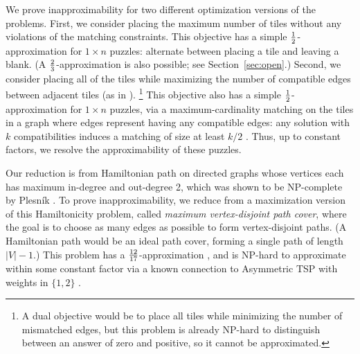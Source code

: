 \documentclass[11pt]{article}
\begin{document}
We prove inapproximability for two different optimization versions of the
problems.  First, we consider placing the maximum number of tiles without
any violations of the matching constraints.
This objective has a simple $1 \over 2$-approximation for $1 \times n$
puzzles: alternate between placing a tile and leaving a blank.
(A $2 \over 3$-approximation is also possible; see Section~\ref{sec:open}.)
Second, we consider placing all of the tiles while maximizing the number of
compatible edges between adjacent tiles (as in \cite{Antoniadis-Lingas-2010}).%
%
\footnote{A dual objective would be to place all tiles while minimizing the
  number of mismatched edges, but this problem is already NP-hard to
  distinguish between an answer of zero and positive, so it cannot be
  approximated.}
%
This objective also has a simple $1 \over 2$-approximation for $1 \times n$
puzzles, via a maximum-cardinality matching on the tiles in a graph where
edges represent having any compatible edges: any solution with $k$
compatibilities induces a matching of size at least $k/2$
\cite{Antoniadis-Lingas-2010}.
Thus, up to constant factors, we resolve the approximability of these puzzles.

Our reduction is from Hamiltonian path on directed graphs whose
vertices each has maximum in-degree and out-degree 2, which was shown to be NP-complete by Plesn{\'i}k \cite{plesnik}.
To prove inapproximability, we reduce from a maximization version of this
Hamiltonicity problem, called \emph{maximum vertex-disjoint path cover}, where
the goal is to choose as many edges as possible to form vertex-disjoint paths.
(A Hamiltonian path would be an ideal path cover, forming a single
path of length $|V|-1$.)  This problem has a $12 \over 17$-approximation
\cite{Vishwanathan-1992},
and is NP-hard to approximate within some constant factor \cite{Enge03}
via a known connection to Asymmetric TSP with weights in $\{1,2\}$
\cite{Vishwanathan-1992}.
\end{document}
